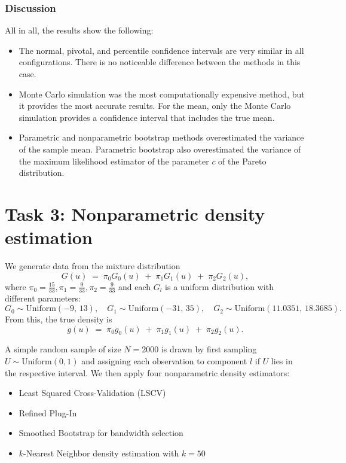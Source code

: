 \documentclass{article}
\begin{document}
\subsubsection{Discussion}

All in all, the results show the following:

\begin{itemize}
    \item The normal, pivotal, and percentile confidence intervals are very similar in all configurations. There is no noticeable difference between the methods in this case.
    \item Monte Carlo simulation was the most computationally expensive method, but it provides the most accurate results. For the mean, only the Monte Carlo simulation provides a confidence interval that includes the true mean.
    \item Parametric and nonparametric bootstrap methods overestimated the variance of the sample mean. Parametric bootstrap also overestimated the variance of the maximum likelihood estimator of the parameter \(c\) of the Pareto distribution.
\end{itemize}

\section{Task 3: Nonparametric density estimation}

We generate data from the mixture distribution 
\[
  G(u) \;=\; \pi_{0} G_{0}(u) \;+\; \pi_{1} G_{1}(u) \;+\; \pi_{2} G_{2}(u),
\]
where \(\pi_{0} = \tfrac{15}{33}, \pi_{1} = \tfrac{9}{33}, \pi_{2} = \tfrac{9}{33}\) and each \(G_{l}\) is a uniform distribution with different parameters:
\[
  G_{0} \sim \mathrm{Uniform}(-9,\,13), \quad
  G_{1} \sim \mathrm{Uniform}(-31,\,35), \quad
  G_{2} \sim \mathrm{Uniform}(11.0351,\,18.3685).
\]
From this, the true density is
\[
   g(u) \;=\; \pi_{0} g_{0}(u) \;+\; \pi_{1} g_{1}(u) \;+\; \pi_{2} g_{2}(u).
\]

A simple random sample of size \(N = 2000\) is drawn by first sampling \(U \sim \text{Uniform}(0, 1)\) and assigning each observation to component \(l\) if \(U\) lies in the respective interval. We then apply four nonparametric density estimators:

\begin{itemize}
  \item Least Squared Cross-Validation (LSCV)
  \item Refined Plug-In
  \item Smoothed Bootstrap for bandwidth selection
  \item \(k\)-Nearest Neighbor density estimation with \(k = 50\)
\end{itemize}
\end{document}
